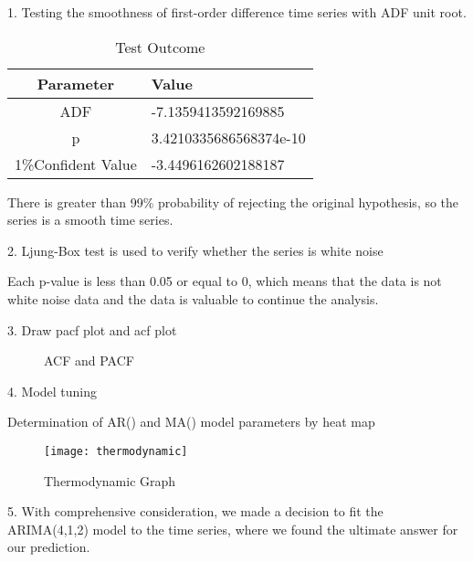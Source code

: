 \documentclass{mcmthesis}
\begin{document}
\hspace*{0.6cm}1. Testing the smoothness of first-order difference time series with ADF unit root.

\begin{table}[!htbp]
\begin{center}
\caption{Test Outcome}
\begin{tabular}{cl}
	\toprule
	\multicolumn{1}{m{3cm}}{\centering Parameter}
	&\multicolumn{1}{m{4cm}}{\centering Value}\\
	\midrule
	ADF & -7.1359413592169885\\
	p &3.4210335686568374e-10\\
	1\%Confident Value &-3.4496162602188187\\
	\bottomrule
\end{tabular}\label{tb:notation}
\end{center}
\end{table}
There is greater than 99\% probability of rejecting the original hypothesis, so the series is a smooth time series.

2. Ljung-Box test is used to verify whether the series is white noise

Each p-value is less than 0.05 or equal to 0, which means that the data is not white noise data and the data is valuable to continue the analysis.

3. Draw pacf plot and acf plot\begin{figure}[htbp]
\centering    %
\caption{ACF and PACF} %
\label{fig:1}  %
\end{figure}

4. Model tuning

Determination of AR() and MA() model parameters by heat map\begin{figure}[h]
\small
\centering
\texttt{[image: thermodynamic]}
\caption{Thermodynamic Graph} \label{fig:aa}
\end{figure}

5. With comprehensive consideration, we made a decision to fit the ARIMA(4,1,2) model to the time series, where we found the ultimate answer for our prediction.
\end{document}
